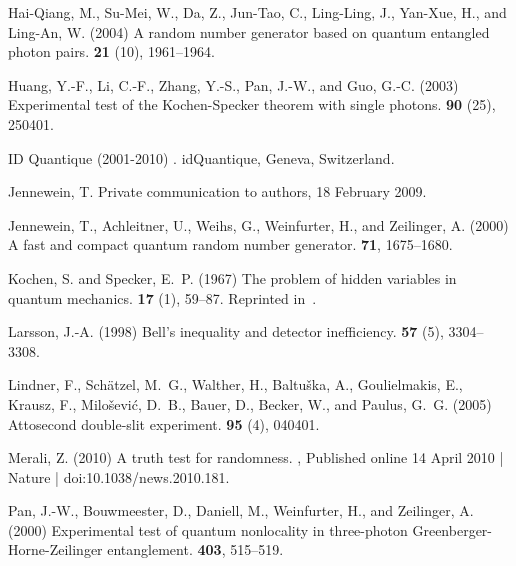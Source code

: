 \documentclass{mscs}
\begin{document}
\begin{thebibliography}{}
Hai-Qiang, M., Su-Mei, W., Da, Z., Jun-Tao, C., Ling-Ling, J., Yan-Xue, H., and
  Ling-An, W. (2004)
\newblock A random number generator based on quantum entangled photon pairs.
 {\bf 21} (10), 1961--1964.

Huang, Y.-F., Li, C.-F., Zhang, Y.-S., Pan, J.-W., and Guo, G.-C. (2003)
\newblock Experimental test of the {K}ochen-{S}pecker theorem with single
  photons.
 {\bf 90} (25), 250401.

{ID Quantique} (2001-2010)
.
\newblock idQuantique, Geneva, Switzerland.

Jennewein, T.
\newblock Private communication to authors, 18 February 2009.

Jennewein, T., Achleitner, U., Weihs, G., Weinfurter, H., and Zeilinger, A.
  (2000)
\newblock A fast and compact quantum random number generator.
 {\bf 71}, 1675--1680.

Kochen, S. and Specker, E.~P. (1967)
\newblock The problem of hidden variables in quantum mechanics.
 {\bf 17} (1), 59--87.
\newblock Reprinted in~\citet[pp. 235--263]{specker-ges}.

Larsson, J.-A. (1998)
\newblock Bell's inequality and detector inefficiency.
 {\bf 57} (5), 3304--3308.

Lindner, F., Sch\"atzel, M.~G., Walther, H., Baltu\v{s}ka, A., Goulielmakis,
  E., Krausz, F., Milo\v{s}evi\'{c}, D.~B., Bauer, D., Becker, W., and Paulus,
  G.~G. (2005)
\newblock Attosecond double-slit experiment.
 {\bf 95} (4), 040401.

Merali, Z. (2010)
\newblock A truth test for randomness.
,
Published online 14 April 2010 | Nature | doi:10.1038/news.2010.181.

Pan, J.-W., Bouwmeester, D., Daniell, M., Weinfurter, H., and Zeilinger, A.
  (2000)
\newblock Experimental test of quantum nonlocality in three-photon
  {G}reenberger-{H}orne-{Z}eilinger entanglement.
 {\bf 403}, 515--519.


\end{thebibliography}
\end{document}
